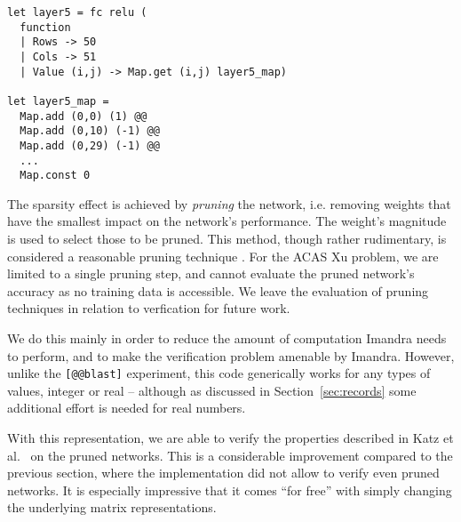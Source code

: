 \documentclass[runningheads]{llncs}
\begin{document}
\begin{lstlisting}[language=caml]
let layer5 = fc relu (
  function
  | Rows -> 50
  | Cols -> 51
  | Value (i,j) -> Map.get (i,j) layer5_map)

let layer5_map =
  Map.add (0,0) (1) @@
  Map.add (0,10) (-1) @@
  Map.add (0,29) (-1) @@
  ...
  Map.const 0
\end{lstlisting}

\noindent The sparsity effect is achieved by \emph{pruning} the network, i.e. removing weights that have the smallest impact on the network's performance. The weight's magnitude is used to select those to be pruned. This method, though rather rudimentary, is considered a reasonable pruning technique \cite{lecun_optimal_1990}. For the ACAS Xu problem, we are limited to a single pruning step, and cannot evaluate the pruned network's accuracy as no training data is accessible. We leave the evaluation of pruning techniques in relation to verfication for future work. 

We do this mainly in order to reduce the amount of computation Imandra needs to perform, and to make the verification problem amenable by Imandra. However, unlike the  \lstinline{[@@blast]} experiment, this code generically works for any types of values, integer or real -- although as discussed in Section~\ref{sec:records} some additional effort is needed for real numbers.

With this representation, we are able to verify the properties described in Katz et al.~\cite{KaBaDiJuKo17Reluplex} on the pruned networks.
This is a considerable improvement compared to the previous section, where the implementation did not allow to verify even pruned networks. It is especially impressive that it comes ``for free'' with simply changing the underlying matrix representations.
\end{document}
